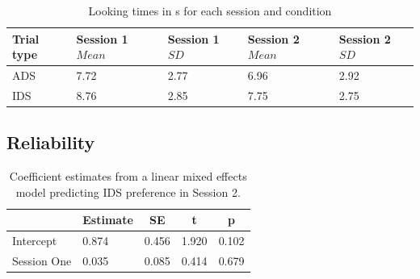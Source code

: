 \documentclass[
  man,floatsintext]{apa6}
\begin{document}
\begin{table}[tbp]

\begin{center}
\begin{threeparttable}

\caption{\label{tab:descriptives_table1}Looking times in s for each session and condition}

\begin{tabular}{lllll}
\toprule
Trial type & Session 1 $Mean$ & Session 1 $SD$ & Session 2 $Mean$ & Session 2 $SD$\\
\midrule
ADS & 7.72 & 2.77 & 6.96 & 2.92\\
IDS & 8.76 & 2.85 & 7.75 & 2.75\\
\bottomrule
\end{tabular}

\end{threeparttable}
\end{center}

\end{table}

\hypertarget{reliability}{%
\subsection{Reliability}\label{reliability}}

\begin{table}[tbp]

\begin{center}
\begin{threeparttable}

\caption{\label{tab:coef_table2}Coefficient estimates from a linear mixed effects model predicting IDS preference in Session 2.}

\begin{tabular}{lllll}
\toprule
 & \multicolumn{1}{c}{Estimate} & \multicolumn{1}{c}{SE} & \multicolumn{1}{c}{t} & \multicolumn{1}{c}{p}\\
\midrule
Intercept & 0.874 & 0.456 & 1.920 & 0.102\\
Session One & 0.035 & 0.085 & 0.414 & 0.679\\
\bottomrule
\end{tabular}

\end{threeparttable}
\end{center}

\end{table}
\end{document}
